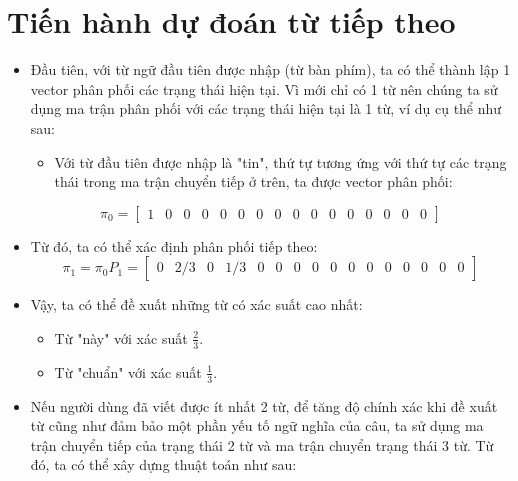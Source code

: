 \section{Tiến hành dự đoán từ tiếp theo}
\begin{itemize}
    \item Đầu tiên, với từ ngữ đầu tiên được nhập (từ bàn phím), ta có thể thành lập 1 vector phân phối các trạng thái hiện tại. Vì mới chỉ có 1 từ nên chúng ta sử dụng ma trận phân phối với các trạng thái hiện tại là 1 từ, ví dụ cụ thể như sau:
    \begin{itemize}
        \item Với từ đầu tiên được nhập là "tin", thứ tự tương ứng với thứ tự các trạng thái trong ma trận chuyển tiếp ở trên, ta được vector phân phối:
    \end{itemize}
    $$
    \pi_0 = 
    \begin{bmatrix}
        1 & 0 & 0 & 0 & 0 & 0 & 0 & 0 & 0 & 0 & 0 & 0 & 0 & 0 & 0 & 0 
    \end{bmatrix} 
    $$
    
    
    \item Từ đó, ta có thể xác định phân phối tiếp theo:
    $$ \pi_1 = \pi_0 P_1 = 
    \begin{bmatrix}
        0 & 2/3 & 0 & 1/3 & 0 & 0 & 0 & 0 & 0 & 0 & 0 & 0 & 0 & 0 & 0 & 0 
    \end{bmatrix}
    $$

    \item Vậy, ta có thể đề xuất những từ có xác suất cao nhất:
    \begin{itemize}
        \item Từ "này" \space với xác suất $\frac{2}{3}.$
        \item Từ "chuẩn" \space với xác suất $\frac{1}{3}.$
        
    \end{itemize}
    
    \item Nếu người dùng đã viết được ít nhất 2 từ, để tăng độ chính xác khi đề xuất từ cũng như đảm bảo một phần yếu tố ngữ nghĩa của câu, ta sử dụng ma trận chuyển tiếp của trạng thái 2 từ và ma trận chuyển trạng thái 3 từ. Từ đó, ta có thể xây dựng thuật toán như sau:


\end{itemize}
